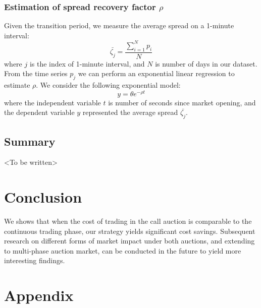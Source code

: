 \documentclass{article}
\begin{document}
\subsubsection{Estimation of spread recovery factor $\rho$}

Given the transition period, we measure the average spread on a 1-minute interval:
\[
  \bar{\zeta_j} = \frac{\sum_{i=1}^N p_i}{N}
\]
where $j$ is the index of 1-minute interval, and $N$ is number of days in our dataset. From the time series $p_j$ we can perform an exponential linear regression to estimate $\rho$. We consider the following exponential model:
\[
  y = \theta e^{-\rho t}
\]
where the independent variable $t$ is number of seconds since market opening, and the dependent variable $y$ represented the average spread $\bar{\zeta_j}$.

\subsection{Summary}

<To be written>

\section{Conclusion}\label{secConclusion}
We shows that when the cost of trading in the call auction is comparable to the continuous trading phase, our strategy yields significant cost savings. Subsequent research on different forms of market impact under both auctions, and extending to multi-phase auction market, can be conducted in the future to yield more interesting findings.

\section{Appendix}
\end{document}
